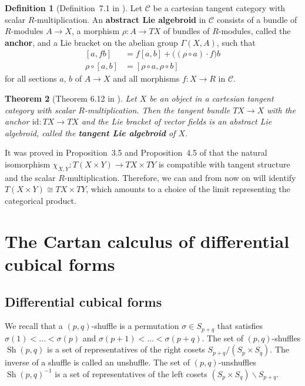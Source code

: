 \documentclass[12pt,reqno, a4paper]{amsart}
\numberwithin{equation}{section}
\theoremstyle{plain}
\newtheorem{Theorem}{Theorem}[section]
\theoremstyle{definition}
\newtheorem{Definition}[Theorem]{Definition}
\theoremstyle{remark}
\DeclareMathOperator{\Shuff}{Sh}
\newcommand{\calC}{\mathcal{C}}
\newcommand{\id}{\mathrm{id}}
\begin{document}
\begin{Definition}[Definition~7.1 in \cite{AintablianBlohmann:2025}]
\label{def:AbstractLieAlgd}
Let $\calC$ be a cartesian tangent category with scalar $R$-mul\-ti\-pli\-ca\-tion. An \textbf{abstract Lie algebroid} in $\calC$ consists of a bundle of $R$-modules $A \to X$, a morphism $\rho: A \to TX$ of bundles of $R$-modules, called the \textbf{anchor}, and a Lie bracket on the abelian group $\Gamma(X,A)$, such that
\begin{align}
\label{eq:LieAlgdLeibniz}
  [a, fb] &= f[a,b] + \bigl((\rho \circ a) \cdot f \bigr) b
  \\
\label{eq:anchorLieAlgMap}
  \rho \circ [a,b] &= [\rho \circ a , \rho \circ b]
\end{align}
for all sections $a$, $b$ of $A \to X$ and all morphisms $f: X \to R$ in $\calC$.
\end{Definition}

\begin{Theorem}[Theorem 6.12 in \cite{AintablianBlohmann:2026}]
\label{thm:TangentLieAlgd}
Let $X$ be an object in a cartesian tangent category with scalar $R$-multiplication. Then the tangent bundle $TX \to X$ with the anchor $\id: TX \to TX$ and the Lie bracket of vector fields is an abstract Lie algebroid, called the \textbf{tangent Lie algebroid} of $X$.
\end{Theorem}

It was proved in Proposition~3.5 and Proposition~4.5 of \cite{AintablianBlohmann:2026} that the natural isomorphism $\chi_{X,Y}: T(X \times Y) \to TX \times TY$ is compatible with tangent structure and the scalar $R$-multiplication. Therefore, we can and from now on will identify $T(X \times Y) \cong TX \times TY$, which amounts to a choice of the limit representing the categorical product.



\section{The Cartan calculus of differential cubical forms}
\label{sec:cubical}



\subsection{Differential cubical forms}

We recall that a $(p,q)$-shuffle is a permutation $\sigma \in S_{p+q}$ that satisfies $\sigma(1) < \ldots < \sigma(p)$ and $\sigma(p+1) < \ldots < \sigma(p+q)$. The set of $(p,q)$-shuffles $\Shuff(p,q)$ is a set of representatives of the right cosets $S_{p+q}/(S_p \times S_q)$. The inverse of a shuffle is called an unshuffle. The set of $(p,q)$-unshuffles $\Shuff(p,q)^{-1}$ is a set of representatives of the left cosets $(S_p \times S_q)\backslash S_{p+q}$.
\end{document}
